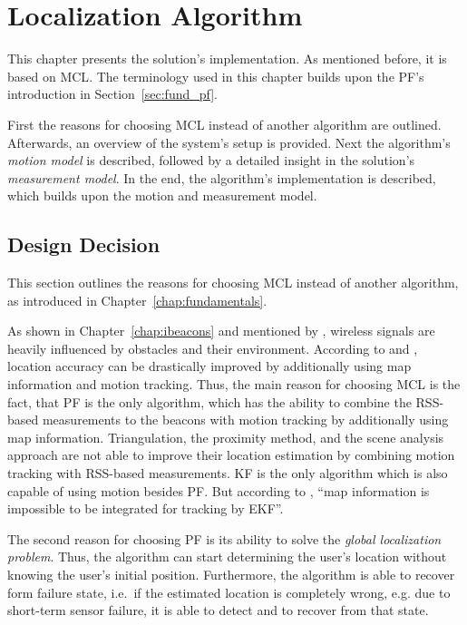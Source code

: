 \chapter{Localization Algorithm} \label{chap:pf}
This chapter presents the solution's implementation. As mentioned before, it is based on \acf{MCL}. The terminology used in this chapter builds upon the \acs{PF}'s introduction in Section~\ref{sec:fund_pf}.

First the reasons for choosing \acs{MCL} instead of another algorithm are outlined. Afterwards, an overview of the system's setup is provided. Next the algorithm's \emph{motion model} is described, followed by a detailed insight in the solution's \emph{measurement model}. In the end, the algorithm's implementation is described, which builds upon the motion and measurement model.


\section{Design Decision} \label{sec:algo_decision}
This section outlines the reasons for choosing \acl{MCL} instead of another algorithm, as introduced in Chapter~\ref{chap:fundamentals}.

As shown in Chapter~\ref{chap:ibeacons} and mentioned by \citet{IEEE:survey_wireless_indoor_pos}, wireless signals are heavily influenced by obstacles and their environment. According to \citet{wang:wlan} and \citet{siddiqi:experiments_mcl_wifi}, location accuracy can be drastically improved by additionally using map information and motion tracking. Thus, the main reason for choosing \ac{MCL} is the fact, that \acl{PF} is the only algorithm, which has the ability to combine the \acs{RSS}-based measurements to the beacons with motion tracking by additionally using map information. Triangulation, the proximity method, and the scene analysis approach are not able to improve their location estimation by combining motion tracking with \ac{RSS}-based measurements. \acl{KF} is the only algorithm which is also capable of using motion besides \ac{PF}. But according to \citet{wang:wlan}, ``map information is impossible to be integrated for tracking by \acs{EKF}''.

The second reason for choosing \acs{PF} is its ability to solve the \emph{global localization problem}. Thus, the algorithm can start determining the user's location without knowing the user's initial position. Furthermore, the algorithm is able to recover form failure state, i.e.\ if the estimated location is completely wrong, e.g. due to short-term sensor failure, it is able to detect and to recover from that state.

